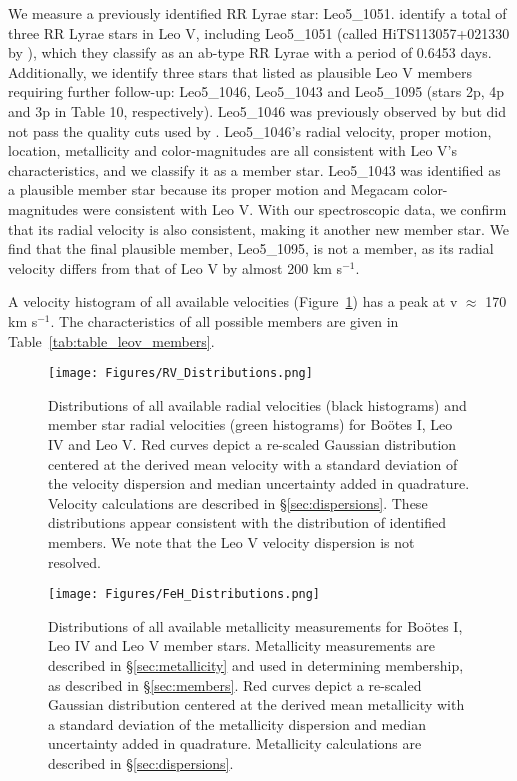 \documentclass[twocolumn]{aastex63}
\begin{document}
We measure a previously identified RR Lyrae star: Leo5\_1051. \citet{med2017} identify a total of three RR Lyrae stars in Leo V, including Leo5\_1051 (called HiTS113057+021330 by \citet{med2017}), which they classify as an ab-type RR Lyrae with a period of 0.6453 days. Additionally, we identify three stars that \citet{mut2020} listed as plausible Leo V members requiring further follow-up: Leo5\_1046, Leo5\_1043 and Leo5\_1095 (stars 2p, 4p and 3p in \citet{mut2020} Table 10, respectively). Leo5\_1046 was previously observed by \citet{wal2009} but did not pass the quality cuts used by \citet{mut2020}. Leo5\_1046's radial velocity, proper motion, location, metallicity and color-magnitudes are all consistent with Leo V's characteristics, and we classify it as a member star. Leo5\_1043 was identified as a plausible member star because its proper motion and Megacam color-magnitudes were consistent with Leo V. With our spectroscopic data, we confirm that its radial velocity is also consistent, making it another new member star. We find that the final plausible member, Leo5\_1095, is not a member, as its radial velocity differs from that of Leo V by almost 200 km s$^{-1}$. 

A velocity histogram of all available velocities (Figure~\ref{rv_hists}) has a peak at v $\approx$ 170 km s$^{-1}$. 
The characteristics of all possible members are given in Table~\ref{tab:table_leov_members}. 
\begin{figure}
\centering
\texttt{[image: Figures/RV\_Distributions.png]}
\caption{Distributions of all available radial velocities (black histograms) and member star radial velocities (green histograms) for Bo{\"o}tes I, Leo IV and Leo V. Red curves depict a re-scaled Gaussian distribution centered at the derived mean velocity with a standard deviation of the velocity dispersion and median uncertainty added in quadrature. Velocity calculations are described in \S\ref{sec:dispersions}. These distributions appear consistent with the distribution of identified members. We note that the Leo V velocity dispersion is not resolved. \label{rv_hists}}
\end{figure}







\begin{figure}
\centering
\texttt{[image: Figures/FeH\_Distributions.png]}
\caption{ Distributions of all available metallicity measurements for Bo{\"o}tes I, Leo IV and Leo V member stars. Metallicity measurements are described in \S\ref{sec:metallicity} and used in determining membership, as described in \S\ref{sec:members}. Red curves depict a re-scaled Gaussian distribution centered at the derived mean metallicity with a standard deviation of the metallicity dispersion and median uncertainty added in quadrature. Metallicity calculations are described in \S\ref{sec:dispersions}. \label{metallicity_distr}}
\end{figure}
\end{document}
